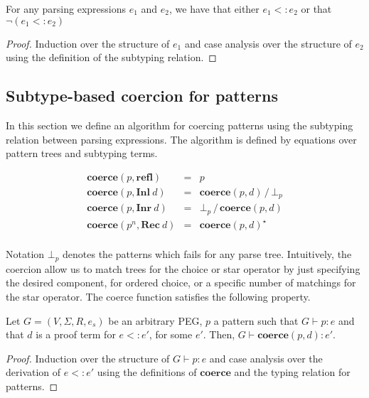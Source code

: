 \begin{theorem}
  For any parsing expressions $e_1$ and $e_2$, we have that either $e_1 <: e_2$ or
  that $\neg (e_1 <: e_2)$
\end{theorem}
\begin{proof}
  Induction over the structure of $e_1$ and case analysis over the structure of $e_2$
  using the definition of the subtyping relation.
\end{proof}


\subsection{Subtype-based coercion for patterns}

In this section we define an algorithm for coercing patterns using the subtyping
relation between parsing expressions. The algorithm is defined by equations over
pattern trees and subtyping terms.

\[
  \begin{array}{lcl}
    \mathbf{coerce}(p,\mathbf{refl}) & = & p\\
    \mathbf{coerce}(p,\mathbf{Inl}\:d) & = & \mathbf{coerce}(p,d)\,/\,\bot_p\\
    \mathbf{coerce}(p,\mathbf{Inr}\:d) & = & \bot_p\,/\,\mathbf{coerce}(p,d)\\
    \mathbf{coerce}(p^n,\mathbf{Rec}\:d) & = & \mathbf{coerce}(p,d)^\star\\
  \end{array}
\]

Notation $\bot_p$ denotes the patterns which fails for any parse tree. Intuitively,
the coercion allow us to match trees for the choice or star operator by just specifying
the desired component, for ordered choice, or a specific number of matchings for the
star operator. The coerce function satisfies the following property.

\begin{theorem}\label{thm:coerce-correct}
  Let $G = (V,\Sigma, R, e_s)$ be an arbitrary PEG, $p$ a pattern such that
  $G\vdash p : e$ and that $d$ is a proof term for $e <: e'$, for some
  $e'$. Then, $G\vdash \mathbf{coerce}(p,d) : e'$.
\end{theorem}
\begin{proof}
  Induction over the structure of $G\vdash p : e$ and case analysis over
  the derivation of $e <: e'$ using the definitions of $\mathbf{coerce}$ and
  the typing relation for patterns.
\end{proof}

